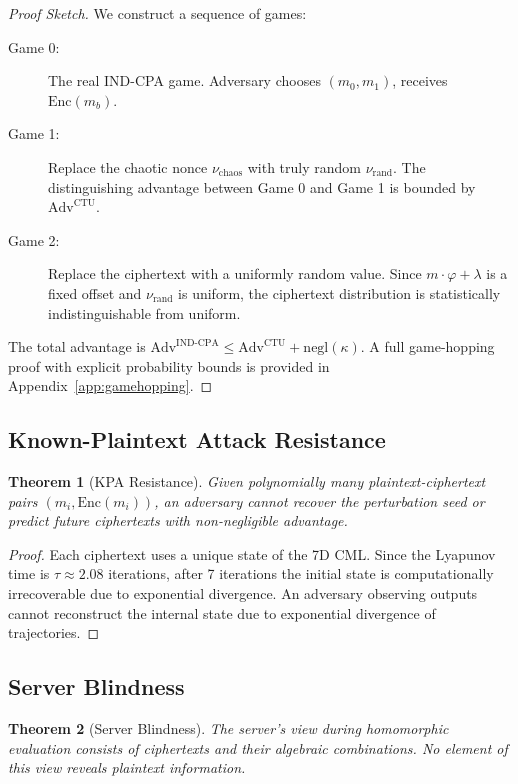 \documentclass[11pt,a4paper]{article}
\newtheorem{theorem}{Theorem}[section]
\begin{document}
\begin{proof}[Proof Sketch]
We construct a sequence of games:
\begin{description}
    \item[Game 0:] The real IND-CPA game. Adversary chooses $(m_0, m_1)$, receives $\text{Enc}(m_b)$.
    \item[Game 1:] Replace the chaotic nonce $\nu_{\text{chaos}}$ with truly random $\nu_{\text{rand}}$. The distinguishing advantage between Game 0 and Game 1 is bounded by $\text{Adv}^{\text{CTU}}$.
    \item[Game 2:] Replace the ciphertext with a uniformly random value. Since $m \cdot \varphi + \lambda$ is a fixed offset and $\nu_{\text{rand}}$ is uniform, the ciphertext distribution is statistically indistinguishable from uniform.
\end{description}
The total advantage is $\text{Adv}^{\text{IND-CPA}} \leq \text{Adv}^{\text{CTU}} + \text{negl}(\kappa)$. A full game-hopping proof with explicit probability bounds is provided in Appendix~\ref{app:gamehopping}.
\end{proof}

\subsection{Known-Plaintext Attack Resistance}

\begin{theorem}[KPA Resistance]
Given polynomially many plaintext-ciphertext pairs $(m_i, \text{Enc}(m_i))$, an adversary cannot recover the perturbation seed or predict future ciphertexts with non-negligible advantage.
\end{theorem}

\begin{proof}
Each ciphertext uses a unique state of the 7D CML. Since the Lyapunov time is $\tau \approx 2.08$ iterations, after 7 iterations the initial state is computationally irrecoverable due to exponential divergence. An adversary observing outputs cannot reconstruct the internal state due to exponential divergence of trajectories.
\end{proof}

\subsection{Server Blindness}

\begin{theorem}[Server Blindness]
The server's view during homomorphic evaluation consists of ciphertexts and their algebraic combinations. No element of this view reveals plaintext information.
\end{theorem}
\end{document}
